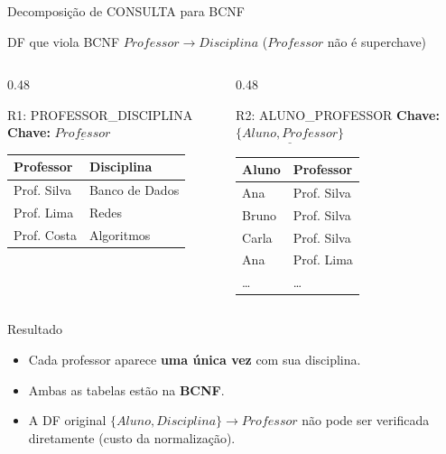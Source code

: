 \documentclass[9pt]{beamer}
\begin{document}
\begin{frame}{Decomposição de CONSULTA para BCNF}
\small

\begin{block}{DF que viola BCNF}
$Professor \to Disciplina$ \quad ($Professor$ não é superchave)
\end{block}

\vspace{0.2cm}

\begin{columns}[t]
  \begin{column}{0.48\textwidth}
    \begin{exampleblock}{R1: PROFESSOR\_DISCIPLINA}
    \textbf{Chave:} $\underline{Professor}$
    \vspace{0.1cm}
    \centering
    \begin{tabular}{|l|l|}
    \hline
    \textbf{Professor} & \textbf{Disciplina} \\ \hline
    Prof. Silva & Banco de Dados \\ \hline
    Prof. Lima  & Redes \\ \hline
    Prof. Costa & Algoritmos \\ \hline
    \end{tabular}
    \end{exampleblock}
  \end{column}

  \begin{column}{0.48\textwidth}
    \begin{exampleblock}{R2: ALUNO\_PROFESSOR}
    \textbf{Chave:} $\underline{\{Aluno, Professor\}}$
    \vspace{0.1cm}
    \centering
    \begin{tabular}{|l|l|}
    \hline
    \textbf{Aluno} & \textbf{Professor} \\ \hline
    Ana   & Prof. Silva \\ \hline
    Bruno & Prof. Silva \\ \hline
    Carla & Prof. Silva \\ \hline
    Ana   & Prof. Lima  \\ \hline
    \ldots & \ldots \\ \hline
    \end{tabular}
    \end{exampleblock}
  \end{column}
\end{columns}

\vspace{0.3cm}
\begin{block}{Resultado}
\begin{itemize}
  \item Cada professor aparece \textbf{uma única vez} com sua disciplina.
  \item Ambas as tabelas estão na \textbf{BCNF}.
  \item A DF original $\{Aluno, Disciplina\} \to Professor$ \alert{não} pode ser verificada diretamente (custo da normalização).
\end{itemize}
\end{block}
\end{frame}
\end{document}
